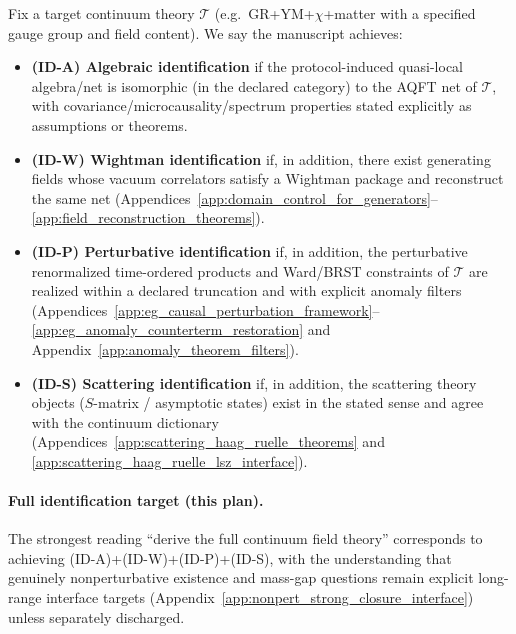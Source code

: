 \begin{definition}
\label{def:identification_levels_contract}
\MathTag Fix a target continuum theory $\mathcal{T}$ (e.g.\ GR+YM+$\chi$+matter with a specified gauge group and field content).
We say the manuscript achieves:
\begin{itemize}
\item \textbf{(ID-A) Algebraic identification} if the protocol-induced quasi-local algebra/net is isomorphic (in the declared category) to the AQFT net of $\mathcal{T}$, with covariance/microcausality/spectrum properties stated explicitly as assumptions or theorems.
\item \textbf{(ID-W) Wightman identification} if, in addition, there exist generating fields whose vacuum correlators satisfy a Wightman package and reconstruct the same net (Appendices~\ref{app:domain_control_for_generators}--\ref{app:field_reconstruction_theorems}).
\item \textbf{(ID-P) Perturbative identification} if, in addition, the perturbative renormalized time-ordered products and Ward/BRST constraints of $\mathcal{T}$ are realized within a declared truncation and with explicit anomaly filters (Appendices~\ref{app:eg_causal_perturbation_framework}--\ref{app:eg_anomaly_counterterm_restoration} and Appendix~\ref{app:anomaly_theorem_filters}).
\item \textbf{(ID-S) Scattering identification} if, in addition, the scattering theory objects ($S$-matrix / asymptotic states) exist in the stated sense and agree with the continuum dictionary (Appendices~\ref{app:scattering_haag_ruelle_theorems} and \ref{app:scattering_haag_ruelle_lsz_interface}).
\end{itemize}
\end{definition}

\paragraph{Full identification target (this plan).}
\AuditTag The strongest reading ``derive the full continuum field theory'' corresponds to achieving (ID-A)+(ID-W)+(ID-P)+(ID-S), with the understanding that genuinely nonperturbative existence and mass-gap questions remain explicit long-range interface targets (Appendix~\ref{app:nonpert_strong_closure_interface}) unless separately discharged.


